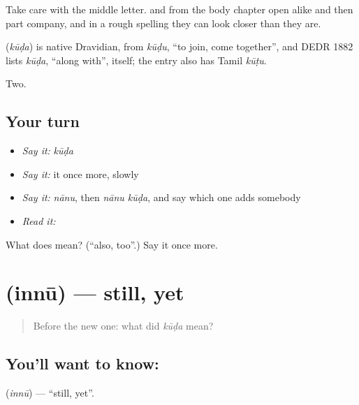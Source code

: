 Take care with the middle letter.  and  from the body chapter open alike and then part company, and in a rough spelling they can look closer than they are.

\begin{cousinweb}
\textbf{} (\emph{kūḍa}) is native Dravidian, from \emph{kūḍu}, \textquotedblleft{}to join, come together\textquotedblright{}, and DEDR 1882 lists \emph{kūḍa}, \textquotedblleft{}along with\textquotedblright{}, itself; the entry also has Tamil \emph{kūṭu}.
\end{cousinweb}

\begin{grammarlens}[title={What you've built}]
Two.
\end{grammarlens}

\subsection*{Your turn}
\begin{itemize}
\raggedright
  \item \emph{Say it:} \emph{kūḍa}
  \item \emph{Say it:} it once more, slowly
  \item \emph{Say it:} \emph{nānu}, then \emph{nānu kūḍa}, and say which one adds somebody
  \item \emph{Read it:} \textbf{}
\end{itemize}

\begin{tcolorbox}[breakable,colback=teal!4,colframe=teal!35!black,title={Before you move on}]
What does  mean? (\textquotedblleft{}also, too\textquotedblright{}.) Say it once more.
\end{tcolorbox}
\section[\texorpdfstring{\kn{ಇನ್ನೂ} (innū)}{ಇನ್ನೂ (innū)}]{ (innū) — still, yet}

\label{lesson:KA-C64-still}



\begin{quote}
Before the new one: what did \emph{kūḍa} mean?
\end{quote}

\subsection*{You'll want to know: }
\textbf{} (\emph{innū}) — \textquotedblleft{}still, yet\textquotedblright{}.

